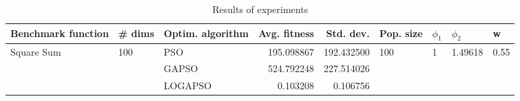 \begin{table}
\centering
\caption{Results of experiments}
\begin{tabular}{lllrrllll}
\toprule
         Benchmark function &              \# dims & Optim. algorithm &  Avg. fitness &  Std. dev. &            Pop. size &         $\phi_{1}$ &               $\phi_{2}$ &                     w \\
\midrule
\multirow{3}{*}{Square Sum} & \multirow{3}{*}{100} &              PSO &    195.098867 & 192.432500 & \multirow{3}{*}{100} & \multirow{3}{*}{1} & \multirow{3}{*}{1.49618} & \multirow{3}{*}{0.55} \\
                            &                      &            GAPSO &    524.792248 & 227.514026 &                      &                    &                          &                       \\
                            &                      &          LOGAPSO &      0.103208 &   0.106756 &                      &                    &                          &                       \\
\bottomrule
\end{tabular}
\end{table}
